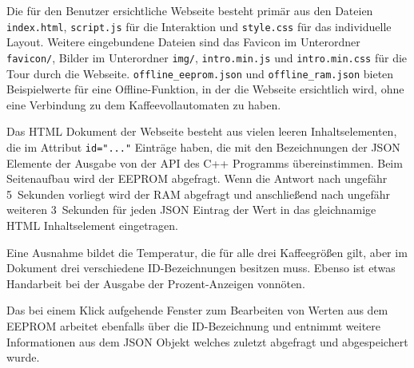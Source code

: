 Die für den Benutzer ersichtliche Webseite besteht primär aus den Dateien \texttt{index.html}, \texttt{script.js} für die Interaktion und \texttt{style.css} für das individuelle Layout.
Weitere eingebundene Dateien sind das Favicon im Unterordner \texttt{favicon/}, Bilder im Unterordner \texttt{img/}, \texttt{intro.min.js} und \texttt{intro.min.css} für die Tour durch die Webseite.
\texttt{offline\_eeprom.json} und \texttt{offline\_ram.json} bieten Beispielwerte für eine Offline-Funktion, in der die Webseite ersichtlich wird, ohne eine Verbindung zu dem Kaffeevollautomaten zu haben.

Das \ac{HTML} Dokument der Webseite besteht aus vielen leeren Inhaltselementen, die im Attribut \texttt{id="..."} Einträge haben, die mit den Bezeichnungen der \ac{JSON} Elemente der Ausgabe von der API des C++ Programms übereinstimmen.
Beim Seitenaufbau wird der \ac{EEPROM} abgefragt.
Wenn die Antwort nach ungefähr 5~Sekunden vorliegt wird der \ac{RAM} abgefragt und anschließend nach ungefähr weiteren 3~Sekunden für jeden \ac{JSON} Eintrag der Wert in das gleichnamige \ac{HTML} Inhaltselement eingetragen.

Eine Ausnahme bildet die Temperatur, die für alle drei Kaffeegrößen gilt, aber im Dokument drei verschiedene ID-Bezeichnungen besitzen muss.
Ebenso ist etwas Handarbeit bei der Ausgabe der Prozent-Anzeigen vonnöten.

Das bei einem Klick aufgehende Fenster zum Bearbeiten von Werten aus dem \ac{EEPROM} arbeitet ebenfalls über die ID-Bezeichnung und entnimmt weitere Informationen aus dem \ac{JSON} Objekt welches zuletzt abgefragt und abgespeichert wurde.
